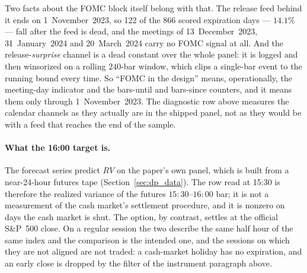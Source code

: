 Two facts about the FOMC block itself belong with that. The release feed
behind it ends on 1~November~2023, so 122 of the 866 scored
expiration days --- $14.1\%$ --- fall after the feed is dead, and the
meetings of
13~December~2023, 31~January~2024 and 20~March~2024 carry no FOMC signal at
all. And the release-\emph{surprise} channel is a dead constant over the
whole panel: it is logged and then winsorized on a rolling $240$-bar
window, which clips a single-bar event to the running bound every time. So
``FOMC in the design'' means, operationally, the meeting-day indicator and
the bars-until and bars-since counters, and it means them only through
1~November~2023. The diagnostic row above measures the calendar channels as
they actually are in the shipped panel, not as they would be with a feed
that reaches the end of the sample.

\paragraph{What the 16:00 target is.} The forecast series predict $RV$ on
the paper's own panel, which is built from a near-24-hour futures tape
(Section~\ref{sec:dp_data}). The row read at 15:30 is therefore the
realized variance of the futures $15{:}30$--$16{:}00$ bar; it is not a
measurement of the cash market's settlement procedure, and it is nonzero on
days the cash market is shut. The option, by contrast, settles at the
official S\&P~500 close. On a regular session the two describe the same
half hour of the same index and the comparison is the intended one, and the
sessions on which they are not aligned are not traded: a cash-market holiday
has no expiration, and an early close is dropped by the filter of the
instrument paragraph above.

